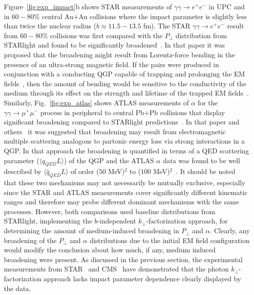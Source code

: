 \documentclass[12pt,epjc3]{svjour3}\sloppy
\begin{document}
Figure~\ref{fig:exp_impact}b shows STAR measurements of $\gamma\gamma \rightarrow e^+e^-$ in UPC and in $60-80\%$ central Au$+$Au collisions where the impact parameter is slightly less than twice the nuclear radius ($b\approx 11.5 - 13.5$ fm). 
The STAR $\gamma\gamma \rightarrow e^+e^-$ result from $60-80\%$ collisions was first compared with the $P_\perp$ distribution from STARlight and found to be significantly broadened~\cite{starcollaborationLowEnsuremathPair2018b}.
In that paper it was proposed that the broadening might result from Lorentz-force bending in the presence of an ultra-strong magnetic field. 
If the pairs were produced in conjunction with a conducting QGP capable of trapping and prolonging the EM fields~\cite{mclerranCommentsElectromagneticField2014}, then the amount of bending would be sensitive to the conductivity of the medium through its effect on the strength and lifetime of the trapped EM fields~\cite{kleinLeptonPairProduction2020a}. 
Similarly, Fig.~\ref{fig:exp_atlas} shows ATLAS measurements of $\alpha$ for the $\gamma\gamma \rightarrow \mu^+\mu^-$ process in peripheral to central Pb$+$Pb collisions that display significant broadening compared to STARlight predictions~\cite{atlascollaborationObservationCentralitydependentAcoplanarity2018}. 
In that paper and others~\cite{mclerranCommentsElectromagneticField2014} it was suggested that broadening may result from electromagnetic multiple scattering analogous to partonic energy loss via strong interactions in a QGP.
In that approach the broadening is quantified in terms of a QED scattering parameter ($\langle\hat{q}_{QED}L\rangle$) of the QGP and the ATLAS $\alpha$ data was found to be well described by $\langle\hat{q}_{QED}L\rangle$ of order ($50$ MeV)$^2$ to ($100$ MeV)$^2$~\cite{kleinLeptonPairProduction2020a,kleinAcoplanarityLeptonPair2019}.
It should be noted that these two mechanisms may not necessarily be mutually exclusive, especially since the STAR and ATLAS measurements cover significantly different kinematic ranges and therefore may probe different dominant mechanisms with the same processes. 
However, both comparisons used baseline distributions from {STARlight}, implementing the $b$-independent $k_\perp$-factorization approach, for determining the amount of medium-induced broadening in $P_\perp$ and $\alpha$.
Clearly, any broadening of the $P_\perp$ and $\alpha$ distributions due to the initial EM field configuration would modify the conclusion about how much, if any, medium induced broadening were present.
As discussed in the previous section, the experimental measurements from STAR~\cite{starcollaborationMeasurementMomentumAngular2021,starcollaborationLowEnsuremathPair2018b} and CMS~\cite{cmscollaborationObservationForwardNeutron2020a} have demonstrated that the photon $k_\perp$-factorization approach lacks impact parameter dependence clearly displayed by the data. 
\end{document}
